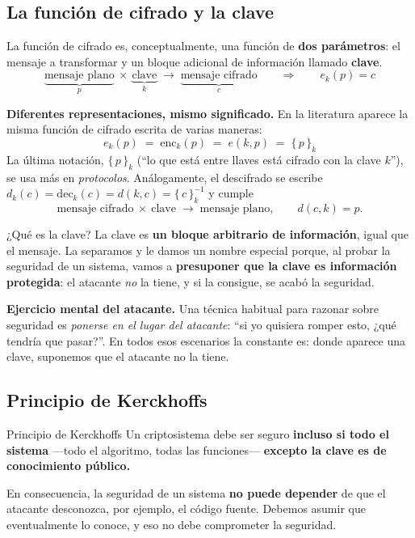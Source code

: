 \documentclass[11pt,a4paper]{article}
\begin{document}
\subsection{La función de cifrado y la clave}
La función de cifrado es, conceptualmente, una función de \textbf{dos parámetros}: el mensaje
a transformar y un bloque adicional de información llamado \textbf{clave}.
\[
  \underbrace{\text{mensaje plano}}_{p}\ \times\ \underbrace{\text{clave}}_{k}
  \;\longrightarrow\; \underbrace{\text{mensaje cifrado}}_{c}
  \qquad\Longrightarrow\qquad e_k(p)=c
\]

\begin{notebox}
\textbf{Diferentes representaciones, mismo significado.} En la literatura aparece la misma
función de cifrado escrita de varias maneras:
\[
  e_k(p) \;=\; \mathrm{enc}_k(p) \;=\; e(k,p) \;=\; \{\,p\,\}_k
\]
La última notación, $\{\,p\,\}_k$ (``lo que está entre llaves está cifrado con la clave $k$''),
se usa más en \emph{protocolos}. Análogamente, el descifrado se escribe
$d_k(c)=\mathrm{dec}_k(c)=d(k,c)=\{\,c\,\}_k^{-1}$ y cumple
\[
  \text{mensaje cifrado}\ \times\ \text{clave} \;\longrightarrow\; \text{mensaje plano},
  \qquad d(c,k)=p .
\]
\end{notebox}

\begin{defbox}{¿Qué es la clave?}
La clave es \textbf{un bloque arbitrario de información}, igual que el mensaje. La separamos
y le damos un nombre especial porque, al probar la seguridad de un sistema, vamos a
\textbf{presuponer que la clave es información protegida}: el atacante \emph{no} la tiene, y
si la consigue, se acabó la seguridad.
\end{defbox}

\begin{notebox}
\textbf{Ejercicio mental del atacante.} Una técnica habitual para razonar sobre seguridad es
\emph{ponerse en el lugar del atacante}: ``si yo quisiera romper esto, ¿qué tendría que
pasar?''. En todos esos escenarios la constante es: donde aparece una clave, suponemos que el
atacante no la tiene.
\end{notebox}

\subsection{Principio de Kerckhoffs}
\begin{defbox}{Principio de Kerckhoffs}
Un criptosistema debe ser seguro \textbf{incluso si todo el sistema} —todo el algoritmo,
todas las funciones— \textbf{excepto la clave es de conocimiento público.}
\end{defbox}
\noindent En consecuencia, la seguridad de un sistema \textbf{no puede depender} de que el
atacante desconozca, por ejemplo, el código fuente. Debemos asumir que eventualmente lo
conoce, y eso no debe comprometer la seguridad.
\end{document}

